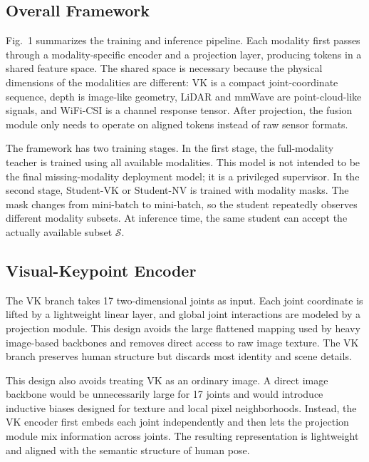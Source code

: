\documentclass[journal, twocolumn, transmag]{IEEEtran}
\begin{document}
\subsection{Overall Framework}
Fig.~1 summarizes the training and inference pipeline. Each modality first passes through a modality-specific encoder and a projection layer, producing tokens in a shared feature space. The shared space is necessary because the physical dimensions of the modalities are different: VK is a compact joint-coordinate sequence, depth is image-like geometry, LiDAR and mmWave are point-cloud-like signals, and WiFi-CSI is a channel response tensor. After projection, the fusion module only needs to operate on aligned tokens instead of raw sensor formats.

The framework has two training stages. In the first stage, the full-modality teacher is trained using all available modalities. This model is not intended to be the final missing-modality deployment model; it is a privileged supervisor. In the second stage, Student-VK or Student-NV is trained with modality masks. The mask changes from mini-batch to mini-batch, so the student repeatedly observes different modality subsets. At inference time, the same student can accept the actually available subset $\mathcal{S}$.

\subsection{Visual-Keypoint Encoder}
The VK branch takes 17 two-dimensional joints as input. Each joint coordinate is lifted by a lightweight linear layer, and global joint interactions are modeled by a projection module. This design avoids the large flattened mapping used by heavy image-based backbones and removes direct access to raw image texture. The VK branch preserves human structure but discards most identity and scene details.

This design also avoids treating VK as an ordinary image. A direct image backbone would be unnecessarily large for 17 joints and would introduce inductive biases designed for texture and local pixel neighborhoods. Instead, the VK encoder first embeds each joint independently and then lets the projection module mix information across joints. The resulting representation is lightweight and aligned with the semantic structure of human pose.
\end{document}
